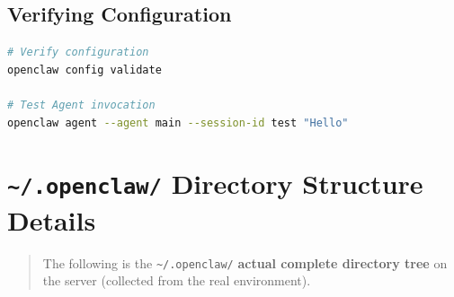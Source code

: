 \subsection{Verifying Configuration}


\begin{lstlisting}[language=bash]
# Verify configuration
openclaw config validate

# Test Agent invocation
openclaw agent --agent main --session-id test "Hello"
\end{lstlisting}

\hrulefill

\section{\texttt{\textasciitilde{}/.openclaw/} Directory Structure Details}


\begin{quote}
The following is the \texttt{\textasciitilde{}/.openclaw/} \textbf{actual complete directory tree} on the server (collected from the real environment).
\end{quote}

